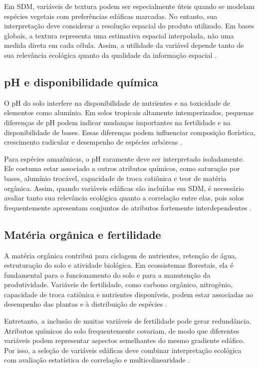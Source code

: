Em SDM, variáveis de textura podem ser especialmente úteis quando se modelam espécies vegetais com preferências edáficas marcadas. No entanto, sua interpretação deve considerar a resolução espacial do produto utilizado. Em bases globais, a textura representa uma estimativa espacial interpolada, não uma medida direta em cada célula. Assim, a utilidade da variável depende tanto de sua relevância ecológica quanto da qualidade da informação espacial \parencite{poggio2021soilgrids,guisan2017habitat}.

\subsection{pH e disponibilidade química}

O pH do solo interfere na disponibilidade de nutrientes e na toxicidade de elementos como alumínio. Em solos tropicais altamente intemperizados, pequenas diferenças de pH podem indicar mudanças importantes na fertilidade e na disponibilidade de bases. Essas diferenças podem influenciar composição florística, crescimento radicular e desempenho de espécies arbóreas \parencite{tuomisto2019diversity}.

Para espécies amazônicas, o pH raramente deve ser interpretado isoladamente. Ele costuma estar associado a outros atributos químicos, como saturação por bases, alumínio trocável, capacidade de troca catiônica e teor de matéria orgânica. Assim, quando variáveis edáficas são incluídas em SDM, é necessário avaliar tanto sua relevância ecológica quanto a correlação entre elas, pois solos frequentemente apresentam conjuntos de atributos fortemente interdependentes \parencite{franklin2010mapping,guisan2017habitat}.

\subsection{Matéria orgânica e fertilidade}

A matéria orgânica contribui para ciclagem de nutrientes, retenção de água, estruturação do solo e atividade biológica. Em ecossistemas florestais, ela é fundamental para o funcionamento do solo e para a manutenção da produtividade. Variáveis de fertilidade, como carbono orgânico, nitrogênio, capacidade de troca catiônica e nutrientes disponíveis, podem estar associadas ao desempenho das plantas e à distribuição de espécies \parencite{tuomisto2019diversity,poggio2021soilgrids}.

Entretanto, a inclusão de muitas variáveis de fertilidade pode gerar redundância. Atributos químicos do solo frequentemente covariam, de modo que diferentes variáveis podem representar aspectos semelhantes do mesmo gradiente edáfico. Por isso, a seleção de variáveis edáficas deve combinar interpretação ecológica com avaliação estatística de correlação e multicolinearidade \parencite{dormann2013collinearity,guisan2017habitat}.

